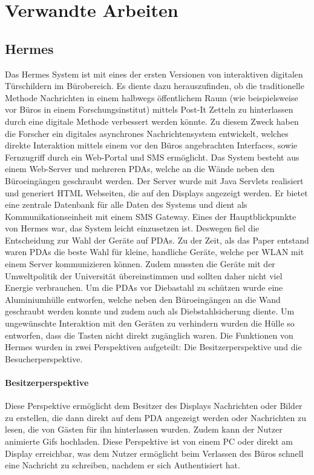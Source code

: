 \chapter{Verwandte Arbeiten}
\section{Hermes}
Das Hermes System\cite{cheverest:2003:paper} ist mit eines der ersten Versionen von interaktiven digitalen Türschildern im Bürobereich.
Es diente dazu herauszufinden, ob die traditionelle Methode Nachrichten in einem halbwegs öffentlichem Raum (wie beispielsweise vor Büros in einem Forschungsinstitut) mittels Post-It Zetteln zu hinterlassen durch eine digitale Methode verbessert werden könnte.
Zu diesem Zweck haben die Forscher ein digitales asynchrones Nachrichtensystem entwickelt, welches direkte Interaktion mittels einem vor den Büros angebrachten Interfaces, sowie Fernzugriff durch ein Web-Portal und SMS ermöglicht.
Das System besteht aus einem Web-Server und mehreren PDAs, welche an die Wände neben den Büroeingängen geschraubt werden.
Der Server wurde mit Java Servlets realisiert und generiert HTML Webseiten, die auf den Displays angezeigt werden. Er bietet eine zentrale Datenbank für alle Daten des Systems und dient als Kommunikationseinheit mit einem SMS Gateway.
Eines der Hauptblickpunkte von Hermes war, das System leicht einzusetzen ist. Deswegen fiel die Entscheidung zur Wahl der Geräte auf PDAs. Zu der Zeit, als das Paper entstand waren PDAs die beste Wahl für kleine, handliche Geräte, welche per WLAN mit einem Server kommunizieren können. Zudem mussten die Geräte mit der Umweltpolitik der Universität übereinstimmen und sollten daher nicht viel Energie verbrauchen.
Um die PDAs vor Diebastahl zu schützen wurde eine Aluminiumhülle entworfen, welche neben den Büroeingängen an die Wand geschraubt werden konnte und zudem auch als Diebstahlsicherung diente. Um ungewünschte Interaktion mit den Geräten zu verhindern wurden die Hülle so entworfen, dass die Tasten nicht direkt zugänglich waren.
Die Funktionen von Hermes wurden in zwei Perspektiven aufgeteilt: Die Besitzerperspektive und die Besucherperspektive.
\subsubsection{Besitzerperspektive}
Diese Perspektive ermöglicht dem Besitzer des Displays Nachrichten oder Bilder zu erstellen, die dann direkt auf dem PDA angezeigt werden oder Nachrichten zu lesen, die von Gästen für ihn hinterlassen wurden. Zudem kann der Nutzer animierte Gifs hochladen.
Diese Perspektive ist von einem PC oder direkt am Display erreichbar, was dem Nutzer ermöglicht beim Verlassen des Büros schnell eine Nachricht zu schreiben, nachdem er sich Authentisiert hat.
